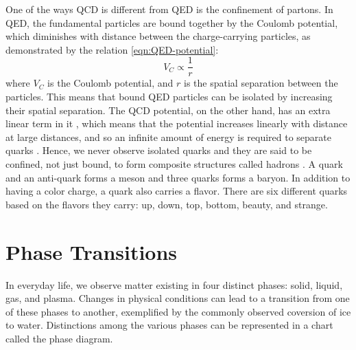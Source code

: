 One of the ways QCD is different from QED is the confinement of partons. In QED, the fundamental particles are bound together by the Coulomb potential, which diminishes with distance between the charge-carrying particles, as demonstrated by the relation \ref{eqn:QED-potential}:
\begin{equation}\label{eqn:QED-potential}
V_{C}\propto\frac{1}{r} 
\end{equation}
where $V_{C}$ is the Coulomb potential, and $r$ is the spatial separation between the particles. This means that bound QED particles can be isolated by increasing their spatial separation. The QCD potential, on the other hand, has an extra linear term in it%
, which means that the potential increases linearly with distance at large distances, and so an infinite amount of energy is required to separate quarks \cite{Bali:2000gf}. Hence, we never observe isolated quarks and they are said to be confined, not just bound, to form composite structures called hadrons \cite{0954-3899-32-3-R01}. A quark and an anti-quark forms a meson and three quarks forms a baryon. In addition to having a color charge, a quark also carries a flavor. There are six different quarks based on the flavors they carry: up, down, top, bottom, beauty, and strange.


\section{Phase Transitions}
In everyday life, we observe matter existing in four distinct phases: solid, liquid, gas, and plasma. Changes in physical conditions can lead to a transition from one of these phases to another, exemplified by the commonly observed coversion of ice to water. Distinctions among the various phases can be represented in a chart called the phase diagram.

